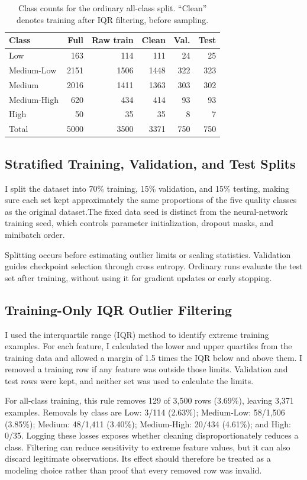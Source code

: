 \documentclass[11pt,letterpaper]{article}
\newcommand{\ML}{Medium-Low}
\newcommand{\MH}{Medium-High}
\begin{document}
\begin{table}[!htbp]
\caption{Class counts for the ordinary all-class split. ``Clean'' denotes training after IQR filtering, before sampling.}
\label{tab:counts}
\centering\small
\setlength{\tabcolsep}{3pt}
\begin{tabular}{lrrrrr}
\toprule
Class & Full & Raw train & Clean & Val. & Test \\
\midrule
Low & 163 & 114 & 111 & 24 & 25 \\
\ML & 2151 & 1506 & 1448 & 322 & 323 \\
Medium & 2016 & 1411 & 1363 & 303 & 302 \\
\MH & 620 & 434 & 414 & 93 & 93 \\
High & 50 & 35 & 35 & 8 & 7 \\
\midrule
Total & 5000 & 3500 & 3371 & 750 & 750 \\
\bottomrule
\end{tabular}
\end{table}

\subsection{Stratified Training, Validation, and Test Splits}
I split the dataset into 70\% training, 15\% validation, and 15\% testing, making sure each set kept approximately the same proportions of the five quality classes as the original dataset.The fixed data seed is distinct from the neural-network training seed, which controls parameter initialization, dropout masks, and minibatch order.

Splitting occurs before estimating outlier limits or scaling statistics. Validation guides checkpoint selection through cross entropy. Ordinary runs evaluate the test set after training, without using it for gradient updates or early stopping. 

\subsection{Training-Only IQR Outlier Filtering}
I used the interquartile range (IQR) method to identify extreme training examples. For each feature, I calculated the lower and upper quartiles from the training data and allowed a margin of 1.5 times the IQR below and above them. I removed a training row if any feature was outside those limits. Validation and test rows were kept, and neither set was used to calculate the limits.

For all-class training, this rule removes 129 of 3,500 rows (3.69\%), leaving 3,371 examples. Removals by class are Low: 3/114 (2.63\%); \ML: 58/1,506 (3.85\%); Medium: 48/1,411 (3.40\%); \MH: 20/434 (4.61\%); and High: 0/35. Logging these losses exposes whether cleaning disproportionately reduces a class. Filtering can reduce sensitivity to extreme feature values, but it can also discard legitimate observations. Its effect should therefore be treated as a modeling choice rather than proof that every removed row was invalid.
\end{document}
